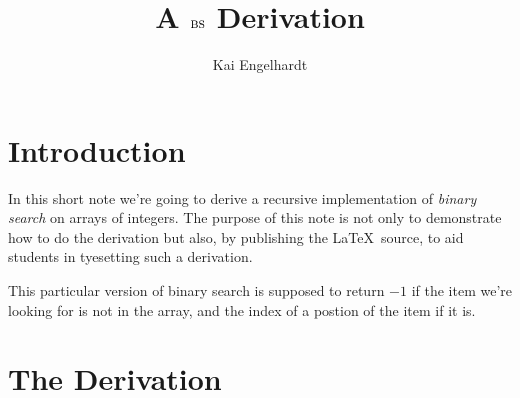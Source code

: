 \documentclass[headings=small,a4paper,12pt]{scrartcl}
\title{A $\textsc{bs}$ Derivation}
\author{Kai Engelhardt}
\begin{document}
\maketitle

\section{Introduction}
\label{sec:introduction}

In this short note we're going to derive a recursive implementation of
\emph{binary search} on arrays of integers. The purpose of this note
is not only to demonstrate how to do the derivation but also, by
publishing the \LaTeX~source, to aid students in tyesetting such a
derivation.

This particular version of binary search is supposed to return $-1$ if
the item we're looking for is not in the array, and the index of a
postion of the item if it is.

\section{The Derivation}
\label{sec:derivation}
\end{document}
